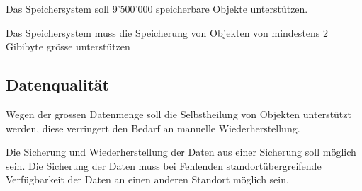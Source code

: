 Das Speichersystem soll 9'500'000 speicherbare Objekte unterstützen.

Das Speichersystem muss die Speicherung von Objekten von mindestens 2 Gibibyte grösse unterstützen

\subsection{Datenqualität}
Wegen der grossen Datenmenge soll die Selbstheilung von Objekten unterstützt werden, diese verringert den Bedarf an manuelle Wiederherstellung.

Die Sicherung und Wiederherstellung der Daten aus einer Sicherung soll möglich sein. Die Sicherung der Daten muss bei Fehlenden standortübergreifende Verfügbarkeit der Daten an einen anderen Standort möglich sein.






